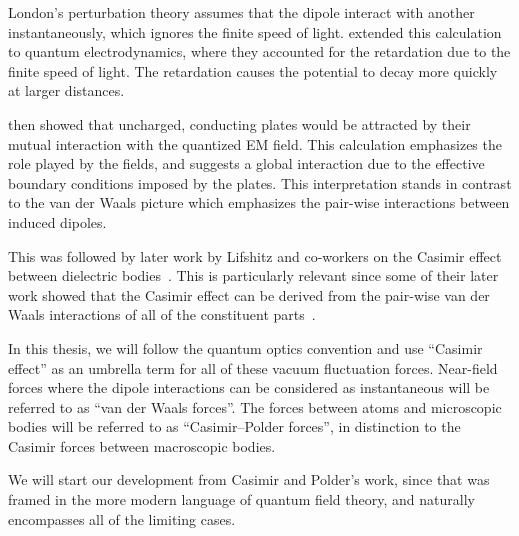 London's perturbation theory assumes that the dipole interact with another instantaneously, which
ignores the finite speed of light.  \citet{CasimirPolder1948} extended this calculation to quantum electrodynamics,
where they accounted for the retardation due to the finite speed of light. 
The retardation causes the potential to decay more quickly at larger distances.  

\citet{Casimir1948} then showed that uncharged, conducting plates would be attracted by their mutual
interaction with the quantized EM field.
This calculation emphasizes the role played by the fields, and suggests
a global interaction due to the effective boundary conditions imposed by the plates.
This interpretation stands in contrast to the van der Waals picture which emphasizes the pair-wise interactions between induced dipoles.

This was followed by later work by Lifshitz and co-workers on the Casimir effect between dielectric bodies~\citep{Lifshitz1956,Dzyaloshinskii1961}.
This is particularly relevant since some of their later work showed that the Casimir effect can be derived 
from the pair-wise van der Waals interactions of all of the constituent parts~\citep{Dzyaloshinskii1961}.  

In this thesis, we will follow the quantum optics convention and use 
``Casimir effect'' as an umbrella term for all of these vacuum fluctuation forces.  
Near-field forces where the dipole interactions can be considered as instantaneous
will be referred to as ``van der Waals forces''.  The forces between atoms and microscopic bodies 
will be referred to as ``Casimir--Polder forces'',  in distinction to the Casimir 
forces between macroscopic bodies.    


We will start our development from Casimir and Polder's work, since that was framed in the more modern language of quantum field theory, 
and naturally encompasses all of the limiting cases.  

